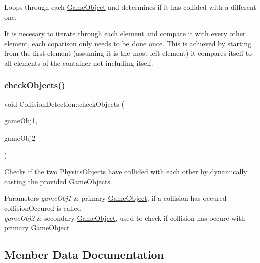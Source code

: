 Loops through each \hyperlink{class_game_object}{Game\+Object} and determines if it has collided with a different one. 

It is necesary to iterate through each element and compare it with every other element, each coparison only needs to be done once. This is achieved by starting from the first element (assuming it is the most left element) it compares itself to all elements of the container not including itself. \mbox{\label{class_collision_detection_a5c7daf7f877c7f9418d36944c4728b75}} 
\subsubsection{\texorpdfstring{check\+Objects()}{checkObjects()}}
{\footnotesize\ttfamily void Collision\+Detection\+::check\+Objects (\begin{DoxyParamCaption}\item[{std\+::shared\+\_\+ptr$<$ \hyperlink{class_game_object}{Game\+Object} $>$}]{game\+Obj1,  }\item[{std\+::shared\+\_\+ptr$<$ \hyperlink{class_game_object}{Game\+Object} $>$}]{game\+Obj2 }\end{DoxyParamCaption})\hspace{0.3cm}{\ttfamily [private]}}



Checks if the two Physics\+Objects have collided with each other by dynamically casting the provided Game\+Objects. 


\begin{DoxyParams}{Parameters}
{\em game\+Obj1} & primary \hyperlink{class_game_object}{Game\+Object}, if a collision has occured collision\+Occured is called \\
\hline
{\em game\+Obj2} & secondary \hyperlink{class_game_object}{Game\+Object}, used to check if collision has occure with primary \hyperlink{class_game_object}{Game\+Object} \\
\hline
\end{DoxyParams}


\subsection{Member Data Documentation}
\mbox{\label{class_collision_detection_a7a894b4bc38b6987d4cf8135df01d83b}} 

